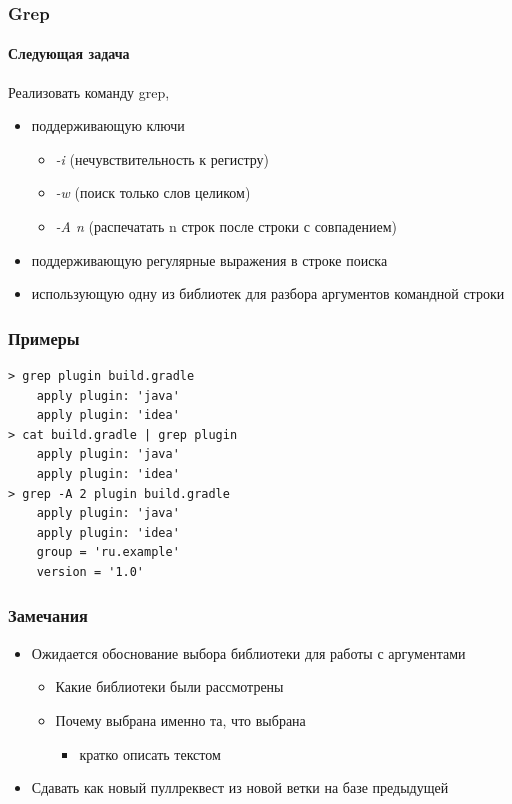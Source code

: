 \documentclass[xetex,mathserif,serif]{beamer}
\begin{document}
	\begin{frame}
		\frametitle{Grep}
		\framesubtitle{Следующая задача}
		Реализовать команду grep, 
		\begin{itemize}
			\item поддерживающую ключи
			\begin{itemize}
				\item \textit{-i} (нечувствительность к регистру)
				\item \textit{-w} (поиск только слов целиком)
				\item \textit{-A n} (распечатать n строк после строки с совпадением)
			\end{itemize}
			\item поддерживающую регулярные выражения в строке поиска
			\item использующую одну из библиотек для разбора аргументов командной строки
		\end{itemize}
	\end{frame}

	\begin{frame}[fragile]
		\frametitle{Примеры}
		\begin{verbatim}
> grep plugin build.gradle
    apply plugin: 'java'
    apply plugin: 'idea'
> cat build.gradle | grep plugin
    apply plugin: 'java'
    apply plugin: 'idea'
> grep -A 2 plugin build.gradle
    apply plugin: 'java'
    apply plugin: 'idea'
    group = 'ru.example'
    version = '1.0'
		\end{verbatim}
\end{frame}

	\begin{frame}
		\frametitle{Замечания}
		\begin{itemize}
			\item Ожидается обоснование выбора библиотеки для работы с аргументами
			\begin{itemize}
				\item Какие библиотеки были рассмотрены
				\item Почему выбрана именно та, что выбрана
				\begin{itemize}
					\item кратко описать текстом
				\end{itemize}
			\end{itemize}
			\item Сдавать как новый пуллреквест из новой ветки на базе предыдущей
		\end{itemize}
	\end{frame}
\end{document}
